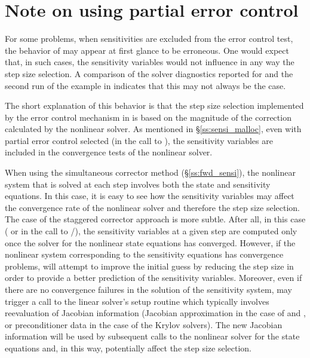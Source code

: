 \section{Note on using partial error control}\label{ss:partial}
For some problems, when sensitivities are excluded from the error control test, 
the behavior of {\cvodes} may appear at first glance to be erroneous. One would
expect that, in such cases, the sensitivity variables would not influence in
any way the step size selection. A comparison of the solver diagnostics 
reported for  and the second run of the  example 
in \cite{cvodes_ex} indicates that this may not always be the case.

The short explanation of this behavior is that the step size selection
implemented by the error control mechanism in {\cvodes} is based on
the magnitude of the correction calculated by the nonlinear solver. As
mentioned in \S\ref{ss:sensi_malloc}, even with partial error control
selected (in the call to ), the
sensitivity variables are included in the convergence tests of the
nonlinear solver.

When using the simultaneous corrector method (\S\ref{ss:fwd_sensi}),
the nonlinear system that is solved at each step involves both the state
and sensitivity equations. In this case, it is easy to see how the sensitivity 
variables may affect the convergence rate of the nonlinear solver and therefore
the step size selection. 
The case of the staggered corrector approach is more subtle. 
After all, in this case ( or  in the call 
to /), the sensitivity variables at a given step
are computed only once the solver for the nonlinear state equations has converged.
However, if the nonlinear system corresponding to the sensitivity equations
has convergence problems, {\cvodes} will attempt to improve the initial guess
by reducing the step size in order to provide a better prediction of the
sensitivity variables. Moreover, even if there are no convergence failures in
the solution of the sensitivity system, {\cvodes} may trigger a call to the
linear solver's setup routine which typically involves reevaluation of Jacobian
information (Jacobian approximation in the case of {\cvdense} and {\cvband}, or
preconditioner data in the case of the Krylov solvers). The new Jacobian information
will be used by subsequent calls to the nonlinear solver for the state equations
and, in this way, potentially affect the step size selection.

